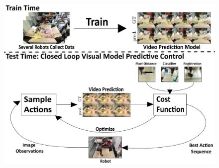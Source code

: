 
\begin{figure}[t]
\centering
\includegraphics[width=\columnwidth,trim={0mm 0 0 0},clip]{images_general/overview_roughdraft.png}
\caption{\small{}}
\label{fig:overview}
\end{figure}


